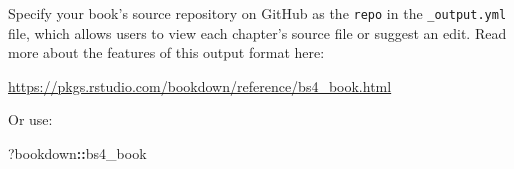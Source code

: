 \documentclass[
]{book}
\newenvironment{Shaded}{\begin{snugshade}}{\end{snugshade}}
\newcommand{\NormalTok}[1]{#1}
\newcommand{\SpecialCharTok}[1]{\textcolor[rgb]{0.81,0.36,0.00}{\textbf{#1}}}
\theoremstyle{definition}
\theoremstyle{definition}
\theoremstyle{definition}
\theoremstyle{definition}
\theoremstyle{remark}
\begin{document}
Specify your book's source repository on GitHub as the \texttt{repo} in the \texttt{\_output.yml} file, which allows users to view each chapter's source file or suggest an edit. Read more about the features of this output format here:

\url{https://pkgs.rstudio.com/bookdown/reference/bs4_book.html}

Or use:

\begin{Shaded}
\begin{Highlighting}[]
\NormalTok{?bookdown}\SpecialCharTok{::}\NormalTok{bs4\_book}
\end{Highlighting}
\end{Shaded}


  
\end{document}
